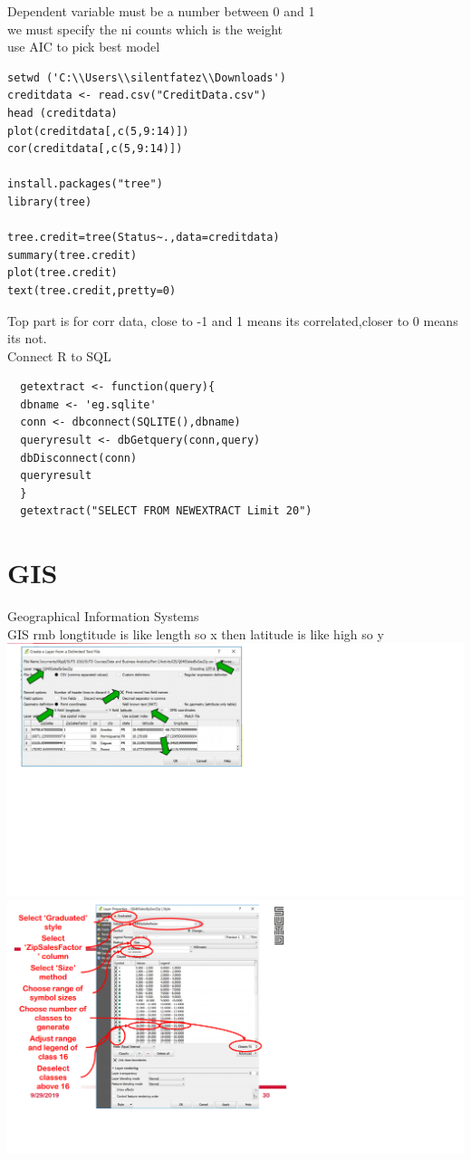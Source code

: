 \documentclass{article}
\begin{document}
Dependent variable must be a number between 0 and 1\\
we must specify the ni counts which is the weight\\
use AIC to pick best model\\
\begin{verbatim}
setwd ('C:\\Users\\silentfatez\\Downloads')
creditdata <- read.csv("CreditData.csv")
head (creditdata)
plot(creditdata[,c(5,9:14)])
cor(creditdata[,c(5,9:14)])

install.packages("tree")
library(tree)

tree.credit=tree(Status~.,data=creditdata)
summary(tree.credit)
plot(tree.credit)
text(tree.credit,pretty=0)

\end{verbatim}
Top part is for corr data, close to -1 and 1 means its correlated,closer to 0 means its not.\\
Connect R to SQL\\
\begin{verbatim}
  getextract <- function(query){
  dbname <- 'eg.sqlite'
  conn <- dbconnect(SQLITE(),dbname)
  queryresult <- dbGetquery(conn,query)
  dbDisconnect(conn)
  queryresult
  }
  getextract("SELECT FROM NEWEXTRACT Limit 20")
\end{verbatim}
\section{GIS}
Geographical Information
Systems\\
GIS rmb longtitude is like length so x then latitude is like high so y\\
\includegraphics{gis}
\includegraphics{gis2}
\end{document}
